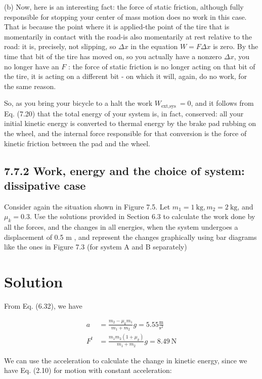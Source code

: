 \documentclass[10pt]{article}
\begin{document}
(b) Now, here is an interesting fact: the force of static friction, although fully responsible for stopping your center of mass motion does no work in this case. That is because the point where it is applied-the point of the tire that is momentarily in contact with the road-is also momentarily at rest relative to the road: it is, precisely, not slipping, so $\Delta x$ in the equation $W=F \Delta x$ is zero. By the time that bit of the tire has moved on, so you actually have a nonzero $\Delta x$, you no longer have an $F$ : the force of static friction is no longer acting on that bit of the tire, it is acting on a different bit - on which it will, again, do no work, for the same reason.

So, as you bring your bicycle to a halt the work $W_{\text {ext,sys }}=0$, and it follows from Eq. (7.20) that the total energy of your system is, in fact, conserved: all your initial kinetic energy is converted to thermal energy by the brake pad rubbing on the wheel, and the internal force responsible for that conversion is the force of kinetic friction between the pad and the wheel.

\subsection*{7.7.2 Work, energy and the choice of system: dissipative case}
Consider again the situation shown in Figure 7.5. Let $m_{1}=1 \mathrm{~kg}, m_{2}=2 \mathrm{~kg}$, and $\mu_{k}=0.3$. Use the solutions provided in Section 6.3 to calculate the work done by all the forces, and the changes in all energies, when the system undergoes a displacement of 0.5 m , and represent the changes graphically using bar diagrams like the ones in Figure 7.3 (for system A and B separately)

\section*{Solution}
From Eq. (6.32), we have


\begin{align*}
a & =\frac{m_{2}-\mu_{k} m_{1}}{m_{1}+m_{2}} g=5.55 \frac{\mathrm{m}}{\mathrm{s}^{2}} \\
F^{t} & =\frac{m_{1} m_{2}\left(1+\mu_{k}\right)}{m_{1}+m_{2}} g=8.49 \mathrm{~N} \tag{7.34}
\end{align*}


We can use the acceleration to calculate the change in kinetic energy, since we have Eq. (2.10) for motion with constant acceleration:
\end{document}
